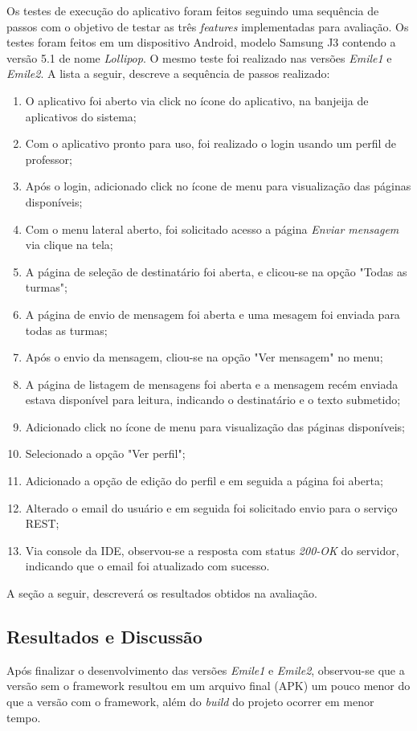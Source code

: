 Os testes de execução do aplicativo foram feitos seguindo uma sequência de passos com o objetivo de testar as três \textit{features} implementadas para avaliação. Os testes foram feitos em um dispositivo Android, modelo Samsung J3 contendo a versão 5.1 de nome \textit{Lollipop}. O mesmo teste foi realizado nas versões \textit{Emile1} e \textit{Emile2}. A lista a seguir, descreve a sequência de passos realizado:

\begin{enumerate}
	\item O aplicativo foi aberto via click no ícone do aplicativo, na banjeija de aplicativos do sistema;
	\item Com o aplicativo pronto para uso, foi realizado o login usando um perfil de professor;
	\item Após o login, adicionado click no ícone de menu para visualização das páginas disponíveis;
	\item Com o menu lateral aberto, foi solicitado acesso a página \textit{Enviar mensagem} via clique na tela;
	\item A página de seleção de destinatário foi aberta, e clicou-se na opção "Todas as turmas";
	\item A página de envio de mensagem foi aberta e uma mesagem foi enviada para todas as turmas;
	\item Após o envio da mensagem, cliou-se na opção "Ver mensagem" no menu;
	\item A página de listagem de mensagens foi aberta e a mensagem recém enviada estava disponível para leitura, indicando o destinatário e o texto submetido;
	\item Adicionado click no ícone de menu para visualização das páginas disponíveis;
	\item Selecionado a opção "Ver perfil";
	\item Adicionado a opção de edição do perfil e em seguida a página foi aberta;
	\item Alterado o email do usuário e em seguida foi solicitado envio para o serviço REST;
	\item Via console da IDE, observou-se a resposta com status \textit{200-OK} do servidor, indicando que o email foi atualizado com sucesso.
\end{enumerate}

A seção a seguir, descreverá os resultados obtidos na avaliação.


\subsection{Resultados e Discussão}
Após finalizar o desenvolvimento das versões \textit{Emile1} e \textit{Emile2}, observou-se que a versão sem o framework resultou em um arquivo final (APK) um pouco menor do que a versão com o framework, além do \textit{build} do projeto ocorrer em menor tempo.

